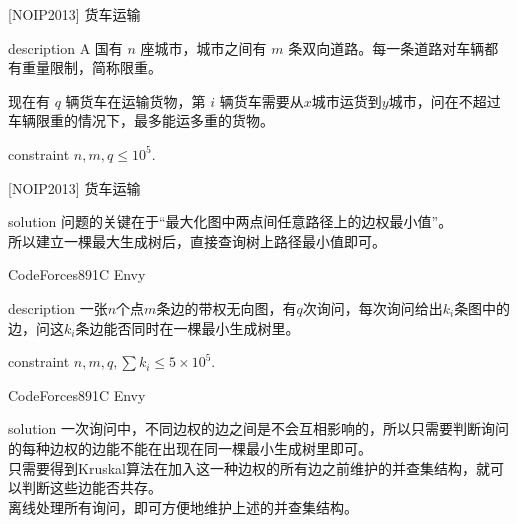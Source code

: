 \documentclass{beamer}
\def\le{\leqslant}
\begin{document}
\begin{frame}{[NOIP2013] 货车运输}
	\begin{block}{description}
		A 国有 $n$ 座城市，城市之间有 $m$ 条双向道路。每一条道路对车辆都有重量限制，简称限重。
		
		现在有 $q$ 辆货车在运输货物，第 $i$ 辆货车需要从$x$城市运货到$y$城市，问在不超过车辆限重的情况下，最多能运多重的货物。
	\end{block}
	\begin{block}{constraint}
		$n, m, q \le 10^5.$
	\end{block}
\end{frame}
\begin{frame}{[NOIP2013] 货车运输}
	\begin{block}{solution}
		问题的关键在于“最大化图中两点间任意路径上的边权最小值”。\\
		
		所以建立一棵最大生成树后，直接查询树上路径最小值即可。
	\end{block}
\end{frame}

\begin{frame}{CodeForces891C Envy}
	\begin{block}{description}
		一张$n$个点$m$条边的带权无向图，有$q$次询问，每次询问给出$k_i$条图中的边，问这$k_i$条边能否同时在一棵最小生成树里。
	\end{block}
	\begin{block}{constraint}
		$n, m, q, \sum k_i \le 5 \times 10^5.$
	\end{block}
\end{frame}
\begin{frame}{CodeForces891C Envy}
	\begin{block}{solution}
		一次询问中，不同边权的边之间是不会互相影响的，所以只需要判断询问的每种边权的边能不能在出现在同一棵最小生成树里即可。\\
		
		只需要得到Kruskal算法在加入这一种边权的所有边之前维护的并查集结构，就可以判断这些边能否共存。\\
		
		离线处理所有询问，即可方便地维护上述的并查集结构。
	\end{block}
\end{frame}
\end{document}
